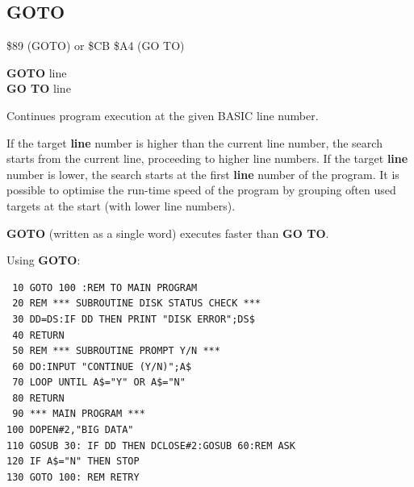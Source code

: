 
\newpage
\subsection{GOTO}
\begin{description}[leftmargin=2cm,style=nextline]
\item [Token:] \$89 (GOTO) or \$CB \$A4 (GO TO)
\item [Format:] {\bf GOTO} line \\
                {\bf GO TO} line
\item [Usage:] Continues program
               execution at the given BASIC line number.

\item [Remarks:] If the target {\bf line} number is higher than the current line number, the
               search starts from the current line, proceeding to higher line numbers.
               If the target {\bf line} number is lower, the search starts
               at the first {\bf line} number of the program.
               It is possible to optimise
               the run-time speed of the program by grouping often used targets at the
               start (with lower line numbers).

               {\bf GOTO} (written as a single word) executes faster than {\bf GO TO}.

\item [Example:] Using {\bf GOTO}:
\begin{tcolorbox}[colback=black,coltext=white]
\verbatimfont{\codefont}
\begin{verbatim}
 10 GOTO 100 :REM TO MAIN PROGRAM
 20 REM *** SUBROUTINE DISK STATUS CHECK ***
 30 DD=DS:IF DD THEN PRINT "DISK ERROR";DS$
 40 RETURN
 50 REM *** SUBROUTINE PROMPT Y/N ***
 60 DO:INPUT "CONTINUE (Y/N)";A$
 70 LOOP UNTIL A$="Y" OR A$="N"
 80 RETURN
 90 *** MAIN PROGRAM ***
100 DOPEN#2,"BIG DATA"
110 GOSUB 30: IF DD THEN DCLOSE#2:GOSUB 60:REM ASK
120 IF A$="N" THEN STOP
130 GOTO 100: REM RETRY
\end{verbatim}
\end{tcolorbox}
\end{description}


\newpage
